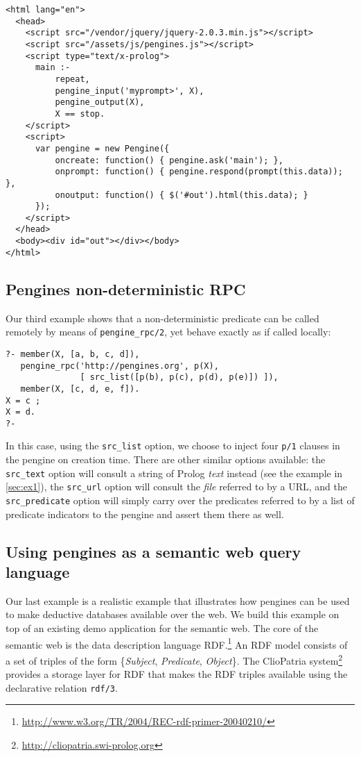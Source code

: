 \documentclass{new_tlp}
\newcommand{\reffont}{\tt}
\newcommand{\predref}[2]{\mbox{\reffont #1/#2}}
\renewcommand{\arg}[1]{\textit{#1}}
\begin{document}
\begin{verbatim}
<html lang="en">
  <head>
    <script src="/vendor/jquery/jquery-2.0.3.min.js"></script>
    <script src="/assets/js/pengines.js"></script>
    <script type="text/x-prolog">
      main :-
          repeat,
          pengine_input('myprompt>', X),
          pengine_output(X),
          X == stop.
    </script>
    <script>
      var pengine = new Pengine({
          oncreate: function() { pengine.ask('main'); },
          onprompt: function() { pengine.respond(prompt(this.data)); },
          onoutput: function() { $('#out').html(this.data); }
      });
    </script>
  </head>
  <body><div id="out"></div></body>
</html>
\end{verbatim}

\subsection{Pengines non-deterministic RPC}

Our third example shows that a non-deterministic predicate can be called
remotely by means of \texttt{pengine\_rpc/2},  yet   behave  exactly  as
if called locally:

\begin{verbatim}
?- member(X, [a, b, c, d]),
   pengine_rpc('http://pengines.org', p(X),
               [ src_list([p(b), p(c), p(d), p(e)]) ]),
   member(X, [c, d, e, f]).
X = c ;
X = d.
?-
\end{verbatim}

In this case, using the \texttt{src\_list} option, we choose to inject
four \texttt{p/1} clauses in the pengine on creation time. There are
other similar options available: the \texttt{src\_text} option will
consult a string of Prolog \textit{text} instead (see the example in
\ref{sec:ex1}), the \texttt{src\_url} option will consult the
\textit{file} referred to by a URL, and the \texttt{src\_predicate}
option will simply carry over the predicates referred to by a list of
predicate indicators to the pengine and assert them there as well.

\subsection{Using pengines as a semantic web query language}
\label{sec:rdf}

Our last example is a realistic example that illustrates how pengines
can be used to make deductive databases available over the web. We build
this example on top of an existing demo application for the semantic
web. The core of the semantic web is the data description language
RDF.\footnote{\url{http://www.w3.org/TR/2004/REC-rdf-primer-20040210/}}
An RDF model consists of a set of triples of the form
\{\arg{Subject}, \arg{Predicate}, \arg{Object}\}. The ClioPatria
system\footnote{\url{http://cliopatria.swi-prolog.org}} provides a
storage layer for RDF that makes the RDF triples available using the
declarative relation \predref{rdf}{3}.
\end{document}
